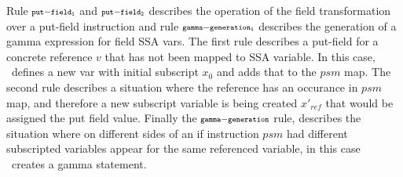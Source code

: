 Rule $\scriptstyle\mathtt{put-field_1}$ and $\scriptstyle\mathtt{put-field_2}$ describes the operation of the field transformation over a
put-field instruction and rule $\scriptstyle\mathtt{gamma-generation_1}$ describes the generation of a gamma expression for field
SSA vars. The first rule describes a put-field for a concrete reference $v$ that has not been mapped to SSA variable. In
this case, \toolshort\ defines a new var with initial subscript $x_0$ and adds that to the $psm$ map.  The second rule
describes a situation where the reference has an occurance in $psm$ map, and therefore a new subscript variable is being
created $x'_{ref}$ that would be assigned the put field value. Finally the $\scriptstyle\mathtt{gamma-generation}$ rule, describes
the situation where on different sides of an if instruction $psm$ had different subscripted variables appear for the
same referenced variable, in this case \toolshort\ creates a gamma statement.

